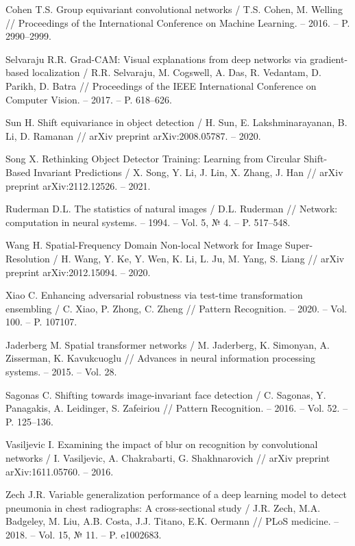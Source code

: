 \begin{thebibliography}{99}
Cohen T.S. Group equivariant convolutional networks / T.S. Cohen, M. Welling // Proceedings of the International Conference on Machine Learning. -- 2016. -- P. 2990--2999.

Selvaraju R.R. Grad-CAM: Visual explanations from deep networks via gradient-based localization / R.R. Selvaraju, M. Cogswell, A. Das, R. Vedantam, D. Parikh, D. Batra // Proceedings of the IEEE International Conference on Computer Vision. -- 2017. -- P. 618--626.

Sun H. Shift equivariance in object detection / H. Sun, E. Lakshminarayanan, B. Li, D. Ramanan // arXiv preprint arXiv:2008.05787. -- 2020.

Song X. Rethinking Object Detector Training: Learning from Circular Shift-Based Invariant Predictions / X. Song, Y. Li, J. Lin, X. Zhang, J. Han // arXiv preprint arXiv:2112.12526. -- 2021.

Ruderman D.L. The statistics of natural images / D.L. Ruderman // Network: computation in neural systems. -- 1994. -- Vol. 5, № 4. -- P. 517--548.

Wang H. Spatial-Frequency Domain Non-local Network for Image Super-Resolution / H. Wang, Y. Ke, Y. Wen, K. Li, L. Ju, M. Yang, S. Liang // arXiv preprint arXiv:2012.15094. -- 2020.

Xiao C. Enhancing adversarial robustness via test-time transformation ensembling / C. Xiao, P. Zhong, C. Zheng // Pattern Recognition. -- 2020. -- Vol. 100. -- P. 107107.

Jaderberg M. Spatial transformer networks / M. Jaderberg, K. Simonyan, A. Zisserman, K. Kavukcuoglu // Advances in neural information processing systems. -- 2015. -- Vol. 28.

Sagonas C. Shifting towards image-invariant face detection / C. Sagonas, Y. Panagakis, A. Leidinger, S. Zafeiriou // Pattern Recognition. -- 2016. -- Vol. 52. -- P. 125--136.

Vasiljevic I. Examining the impact of blur on recognition by convolutional networks / I. Vasiljevic, A. Chakrabarti, G. Shakhnarovich // arXiv preprint arXiv:1611.05760. -- 2016.

Zech J.R. Variable generalization performance of a deep learning model to detect pneumonia in chest radiographs: A cross-sectional study / J.R. Zech, M.A. Badgeley, M. Liu, A.B. Costa, J.J. Titano, E.K. Oermann // PLoS medicine. -- 2018. -- Vol. 15, № 11. -- P. e1002683.


\end{thebibliography}
